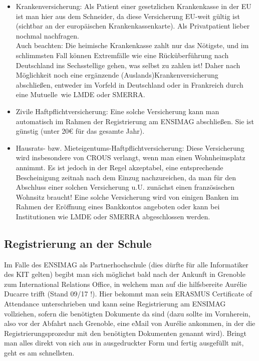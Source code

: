 \documentclass[11pt,a4paper]{article}
\begin{document}
	\begin{itemize}
		\item Krankenversicherung: Als Patient einer gesetzlichen Krankenkasse in der EU ist man hier aus dem Schneider, da diese Versicherung EU-weit gültig ist (sichtbar an der europäischen Krankenkassenkarte). Als Privatpatient lieber nochmal nachfragen.\\
		Auch beachten: Die heimische Krankenkasse zahlt nur das Nötigste, und im schlimmsten Fall können Extremfälle wie eine Rücküberführung nach Deutschland ins Sechsstellige gehen, was selbst zu zahlen ist! Daher nach Möglichkeit noch eine ergänzende (Auslands)Krankenversicherung abschließen, entweder im Vorfeld in Deutschland oder in Frankreich durch eine \glqq Mutuelle\grqq\ wie LMDE oder SMERRA.
		\item Zivile Haftpflichtversicherung: Eine solche Versicherung kann man automatisch im Rahmen der Registrierung am ENSIMAG abschließen. Sie ist günstig (unter 20€ für das gesamte Jahr).
		\item Hausrats- bzw. Mieteigentums-Haftpflichtversicherung: Diese Versicherung wird insbesondere von CROUS verlangt, wenn man einen Wohnheimsplatz annimmt. Es ist jedoch in der Regel akzeptabel, eine entsprechende Bescheinigung zeitnah nach dem Einzug nachzureichen, da man für den Abschluss einer solchen Versicherung u.U. zunächst einen französischen Wohnsitz braucht! Eine solche Versicherung wird von einigen Banken im Rahmen der Eröffnung eines Bankkontos angeboten oder kann bei Institutionen wie LMDE oder SMERRA abgeschlossen werden.
	\end{itemize}
	
	\subsection{Registrierung an der Schule}
	
	Im Falle des ENSIMAG als Partnerhochschule (dies dürfte für alle Informatiker des KIT gelten) begibt man sich möglichst bald nach der Ankunft in Grenoble zum International Relations Office, in welchem man auf die hilfsbereite Aurélie Ducarre trifft (Stand 09/17 !). Hier bekommt man sein ERASMUS Certificate of Attendance unterschrieben und kann seine Registrierung am ENSIMAG vollziehen, sofern die benötigten Dokumente da sind (dazu sollte im Vornherein, also vor der Abfahrt nach Grenoble, eine eMail von Aurélie ankommen, in der die Registrierungsprozedur mit den benötigten Dokumenten genannt wird). Bringt man alles direkt von sich aus in ausgedruckter Form und fertig ausgefüllt mit, geht es am schnellsten.
	
\end{document}
